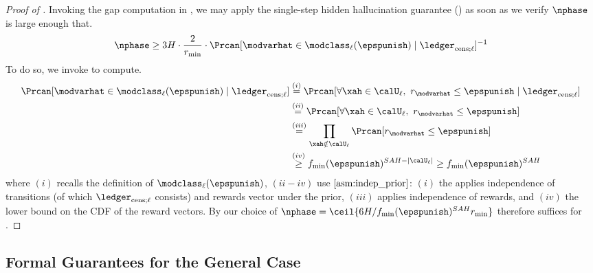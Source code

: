 \begin{proof}[Proof of ]
  Invoking the gap computation in , we may apply the single-step hidden hallucination guarantee () as soon as we verify $\nphase$ is large enough that.
  \begin{align}
  \nphase \ge 3H \cdot \frac{2}{r_{\min}} \cdot \Prcan[\modvarhat \in \modclass_{\ell}(\epspunish) \mid \ledcensl]^{-1} \label{eq:nphase_lb_one}
  \end{align}
  To do so, we invoke  to compute.
 \begin{align}
\Prcan[\modvarhat \in \modclass_{\ell}(\epspunish) \mid \ledcensl] &\overset{(i)}{=} \Prcan[\forall \xah \in \calU_{\ell},~ r_{\modvarhat} \le \epspunish \mid \ledcensl] \nonumber \\
&\overset{(ii)}{=} \Prcan[\forall \xah \in \calU_{\ell},~ r_{\modvarhat} \le \epspunish ] \nonumber\\
&\overset{(iii)}{=} \prod_{\xah \notin \calU_{\ell}}\Prcan[r_{\modvarhat} \le \epspunish ]\nonumber\\
&\overset{(iv)}{\ge} f_{\min}(\epspunish)^{SAH - |\calU_{\ell}|} \ge f_{\min}(\epspunish)^{SAH}  \label{eq:punish_det_lb}
 \end{align}
 where $(i)$ recalls the definition of $\modclass_{\ell}(\epspunish)$, $(ii-iv)$ use $\Cref{asm:indep_prior}$: $(i)$ the applies independence of transitions (of which $\ledcensl$ consists) and rewards vector under the prior, $(iii)$ applies independence of rewards, and $(iv)$ the lower bound on the CDF of the reward vectors. By our choice of $\nphase = \ceil{6H/f_{\min}(\epspunish)^{SAH}r_{\min}}$ therefore suffices for .
\end{proof}

\subsection{Formal Guarantees for the General Case}




\newcommand{\qpunish}{q_{\mathrm{pun}}}
\newcommand{\ralt}{r_{\mathrm{alt}}}
\newcommand{\Expsimhh}{\Expop_{\ledhall \sim \mathrm{hh}}}
\newcommand{\Prsimhh}{\Prop_{\ledhall \sim \mathrm{hh}}}

\newcommand{\Dhall}{\mathcal{D}_{\mathrm{hal};\ell}}
\newcommand{\Dhalnol}{\mathcal{D}_{\mathrm{hal}}}
\newcommand{\ledcens}{\ledger_{\mathrm{cens}}}
\newcommand{\Utot}{\mathcal{U}_{\mathrm{all}}}
\newcommand{\modpunish}{\mathcal{M}_{\mathrm{pun}}}

